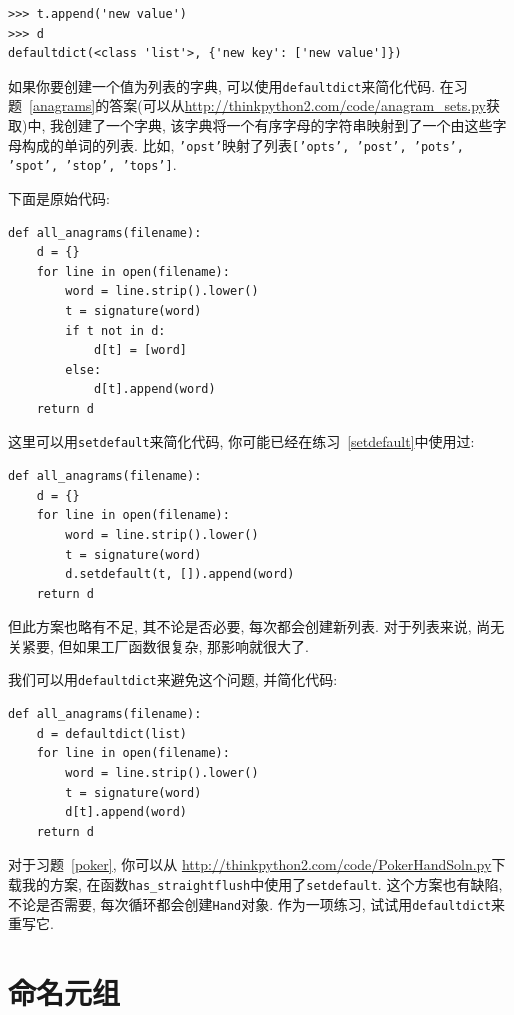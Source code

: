 \documentclass[10pt]{book}
\begin{document}
\begin{verbatim}
>>> t.append('new value')
>>> d
defaultdict(<class 'list'>, {'new key': ['new value']})
\end{verbatim}

如果你要创建一个值为列表的字典, 可以使用{\tt defaultdict}来简化代码. 
在习题~\ref{anagrams}的答案(可以从\url{http://thinkpython2.com/code/anagram_sets.py}获取)中, 
我创建了一个字典, 该字典将一个有序字母的字符串映射到了一个由这些字母构成的单词的列表. 
比如, {\tt 'opst'}映射了列表{\tt ['opts', 'post', 'pots', 'spot', 'stop', 'tops']}.

下面是原始代码:

\begin{verbatim}
def all_anagrams(filename):
    d = {}
    for line in open(filename):
        word = line.strip().lower()
        t = signature(word)
        if t not in d:
            d[t] = [word]
        else:
            d[t].append(word)
    return d
\end{verbatim}

这里可以用{\tt setdefault}来简化代码, 你可能已经在练习~\ref{setdefault}中使用过:

\begin{verbatim}
def all_anagrams(filename):
    d = {}
    for line in open(filename):
        word = line.strip().lower()
        t = signature(word)
        d.setdefault(t, []).append(word)
    return d
\end{verbatim}

但此方案也略有不足, 其不论是否必要, 每次都会创建新列表. 
对于列表来说, 尚无关紧要, 但如果工厂函数很复杂, 
那影响就很大了. 

我们可以用{\tt defaultdict}来避免这个问题, 并简化代码:

\begin{verbatim}
def all_anagrams(filename):
    d = defaultdict(list)
    for line in open(filename):
        word = line.strip().lower()
        t = signature(word)
        d[t].append(word)
    return d
\end{verbatim}

对于习题~\ref{poker}, 你可以从
\url{http://thinkpython2.com/code/PokerHandSoln.py}下载我的方案, 
在函数\verb"has_straightflush"中使用了{\tt setdefault}. 
这个方案也有缺陷, 不论是否需要, 每次循环都会创建{\tt Hand}对象. 
作为一项练习, 试试用{\tt defaultdict}来重写它. 


\section{命名元组}
\label{Named tuples}
\end{document}
